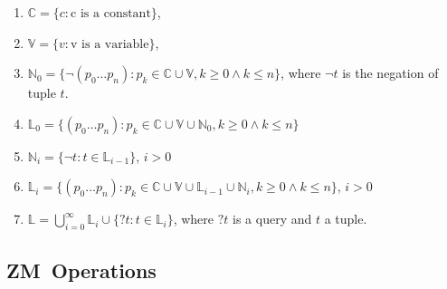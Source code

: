 \documentclass[11pt,a4paper]{report}
\newcommand{\zm}{ZM}
\newcommand{\var}[1]{`#1}
\begin{document}
\begin{enumerate}
\item $\mathbb{C} = \{c: \text{c is a constant} \}$,
\item $\mathbb{V} = \{v: \text{v is a variable} \}$,
\item $\mathbb{N}_{0} = \{\neg (p_{0} \ldots p_{n}): p_{k} \in \mathbb{C} \cup \mathbb{V}, k \geq 0 \wedge k \leq n \}$, where $\neg t$ is the negation of tuple $t$.
\item $\mathbb{L}_{0} = \{(p_{0} \ldots p_{n}) : p_{k} \in \mathbb{C} \cup \mathbb{V} \cup \mathbb{N}_{0}, k \geq 0 \wedge k \leq n \}$

\item $\mathbb{N}_{i} = \{\neg t: t \in \mathbb{L}_{i-1}\}$, $i > 0$
\item $\mathbb{L}_{i} = \{(p_{0} \ldots p_{n}) : p_{k} \in \mathbb{C} \cup \mathbb{V} \cup \mathbb{L}_{i-1} \cup \mathbb{N}_{i}, k \geq 0 \wedge k \leq n \}$, $i > 0$

\item $\mathbb{L} = \bigcup\limits_{i=0}^{\infty} \mathbb{L}_{i} \cup \{?t : t \in \mathbb{L}_{i} \}$, where $?t$ is a query and $t$ a tuple.
\end{enumerate}



\subsection{\zm\ Operations}
\end{document}
